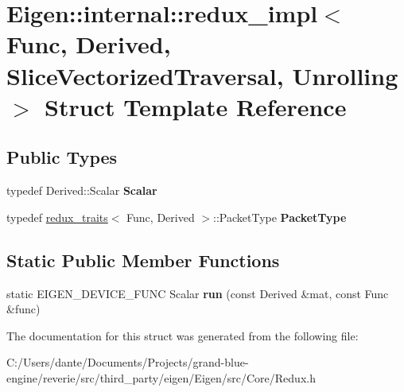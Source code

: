 \hypertarget{struct_eigen_1_1internal_1_1redux__impl_3_01_func_00_01_derived_00_01_slice_vectorized_traversal_00_01_unrolling_01_4}{}\section{Eigen\+::internal\+::redux\+\_\+impl$<$ Func, Derived, Slice\+Vectorized\+Traversal, Unrolling $>$ Struct Template Reference}
\label{struct_eigen_1_1internal_1_1redux__impl_3_01_func_00_01_derived_00_01_slice_vectorized_traversal_00_01_unrolling_01_4}
\subsection*{Public Types}
\begin{DoxyCompactItemize}
\item 
\mbox{\label{struct_eigen_1_1internal_1_1redux__impl_3_01_func_00_01_derived_00_01_slice_vectorized_traversal_00_01_unrolling_01_4_a8b28971f75581d5de136af071dc9aae3}} 
typedef Derived\+::\+Scalar {\bfseries Scalar}
\item 
\mbox{\label{struct_eigen_1_1internal_1_1redux__impl_3_01_func_00_01_derived_00_01_slice_vectorized_traversal_00_01_unrolling_01_4_a919789f56768fcdf6469b8132705fa4b}} 
typedef \mbox{\hyperlink{struct_eigen_1_1internal_1_1redux__traits}{redux\+\_\+traits}}$<$ Func, Derived $>$\+::Packet\+Type {\bfseries Packet\+Type}
\end{DoxyCompactItemize}
\subsection*{Static Public Member Functions}
\begin{DoxyCompactItemize}
\item 
\mbox{\label{struct_eigen_1_1internal_1_1redux__impl_3_01_func_00_01_derived_00_01_slice_vectorized_traversal_00_01_unrolling_01_4_a1bd17f4693bd0df8c669a65990aaa248}} 
static E\+I\+G\+E\+N\+\_\+\+D\+E\+V\+I\+C\+E\+\_\+\+F\+U\+NC Scalar {\bfseries run} (const Derived \&mat, const Func \&func)
\end{DoxyCompactItemize}


The documentation for this struct was generated from the following file\+:\begin{DoxyCompactItemize}
\item 
C\+:/\+Users/dante/\+Documents/\+Projects/grand-\/blue-\/engine/reverie/src/third\+\_\+party/eigen/\+Eigen/src/\+Core/Redux.\+h\end{DoxyCompactItemize}
